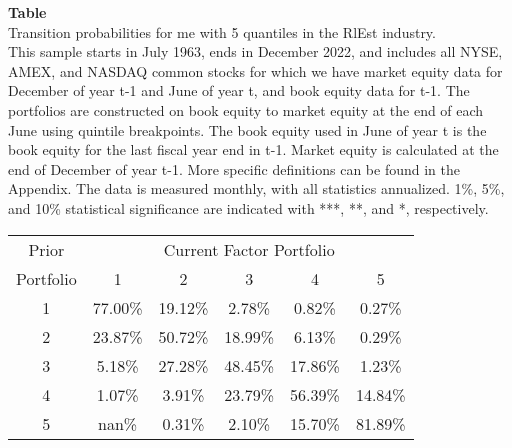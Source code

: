 \begin{table*}[ht!]
\raggedright
{}
\label{tab: transition_probs_me_RlEst_with_5_quantiles}
\textbf{Table \thetable} \\
Transition probabilities for me with 5 quantiles in the RlEst industry. \\
\hspace*{1em}This sample starts in July 1963, ends in December 2022, and includes all NYSE, AMEX, and NASDAQ common stocks for which we have market equity data for December of year t-1 and June of year t, and book equity data for t-1. The portfolios are constructed on book equity to market equity at the end of each June using quintile breakpoints.  The book equity used in June of year t is the book equity for the last fiscal year end in t-1.  Market equity is calculated at the end of December of year t-1.  More specific definitions can be found in the Appendix.  The data is measured monthly, with all statistics annualized.  1\%, 5\%, and 10\% statistical significance are indicated with ***, **, and *, respectively. \\
\vspace{0.5em}
\centering
\begin{adjustbox}{max width=\textwidth}
\begin{tabular}{@{}cccccc@{}}
\toprule
Prior & \multicolumn{5}{c}{Current Factor Portfolio} \\
Portfolio & 1 & 2 & 3 & 4 & 5 \\
\midrule
1 & 77.00\% & 19.12\% & 2.78\% & 0.82\% & 0.27\% \\
2 & 23.87\% & 50.72\% & 18.99\% & 6.13\% & 0.29\% \\
3 & 5.18\% & 27.28\% & 48.45\% & 17.86\% & 1.23\% \\
4 & 1.07\% & 3.91\% & 23.79\% & 56.39\% & 14.84\% \\
5 & nan\% & 0.31\% & 2.10\% & 15.70\% & 81.89\% \\
\bottomrule
\end{tabular}
\end{adjustbox}
\end{table*}